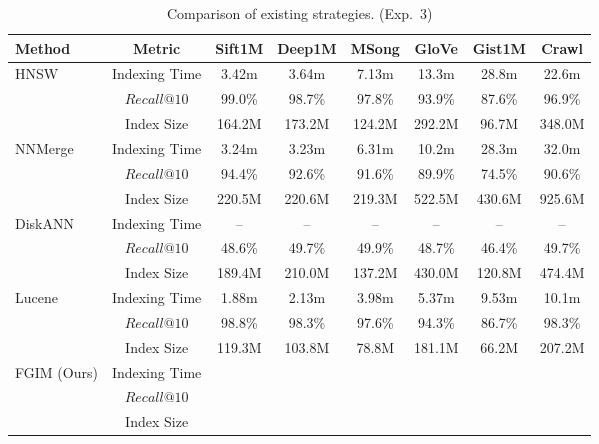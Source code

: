 \documentclass[acmsmall]{acmart}
\theoremstyle{remark}
\theoremstyle{definition}
\begin{document}
\begin{table}[t]
	\small
	\centering
	\caption{Comparison of existing strategies. (Exp.~3)}
	\vspace{-1ex}
	\begin{tabular}{lccccccc}
		\toprule
		\textbf{Method} & \textbf{Metric} & \textbf{Sift1M} & \textbf{Deep1M} & \textbf{MSong} & \textbf{GloVe} & \textbf{Gist1M} & \textbf{Crawl} \\
		\midrule
		\multirow{3}{*}{HNSW} 
		& Indexing Time & 3.42m & 3.64m & 7.13m & 13.3m & 28.8m & 22.6m \\
		& $Recall@10$ & 99.0\% & 98.7\% & 97.8\% & 93.9\% & 87.6\% & 96.9\% \\
		& Index Size & 164.2M & 173.2M & 124.2M & 292.2M & 96.7M & 348.0M \\
		\midrule
		\multirow{3}{*}{NNMerge}
		& Indexing Time & 3.24m & 3.23m & 6.31m & 10.2m & 28.3m & 32.0m \\
		& $Recall@10$ & 94.4\% & 92.6\% & 91.6\% & 89.9\% & 74.5\% & 90.6\% \\
		& Index Size & 220.5M & 220.6M & 219.3M & 522.5M & 430.6M & 925.6M \\
		\midrule
		\multirow{3}{*}{DiskANN}
		& Indexing Time & -- & -- & -- & -- & -- & -- \\
		& $Recall@10$ & 48.6\% & 49.7\% & 49.9\% & 48.7\% & 46.4\% & 49.7\% \\
		& Index Size & 189.4M & 210.0M & 137.2M & 430.0M & 120.8M & 474.4M \\
		\midrule
		\multirow{3}{*}{Lucene}
		& Indexing Time & 1.88m & 2.13m & 3.98m & 5.37m & 9.53m & 10.1m \\
		& $Recall@10$ & 98.8\% & 98.3\% & 97.6\% & 94.3\% & 86.7\% & 98.3\% \\
		& Index Size & 119.3M & 103.8M & 78.8M & 181.1M & 66.2M & 207.2M \\
		\midrule
		\multirow{3}{*}{FGIM (Ours)}
		& Indexing Time & \cellcolor{gray!30}{1.46m} & \cellcolor{gray!30}{1.49m} & \cellcolor{gray!30}{2.41m} & \cellcolor{gray!30}{4.43m} & \cellcolor{gray!30}{8.20m} & \cellcolor{gray!30}{10.5m} \\
		& $Recall@10$ & \cellcolor{gray!30}{99.3\%} & \cellcolor{gray!30}{99.1\%} & \cellcolor{gray!30}{98.8\%} & \cellcolor{gray!30}{96.5\%} & \cellcolor{gray!30}{91.3\%} & \cellcolor{gray!30}{99.0\%} \\
		& Index Size & \cellcolor{gray!30}{123.3M} & \cellcolor{gray!30}{134.3M} & \cellcolor{gray!30}{92.3M} & \cellcolor{gray!30}{324.3M} & \cellcolor{gray!30}{100.7M} & \cellcolor{gray!30}{277.2M} \\
		\bottomrule
	\end{tabular}
	\label{tab:existing_method}
	\vspace{-1ex}
\end{table}
\end{document}
